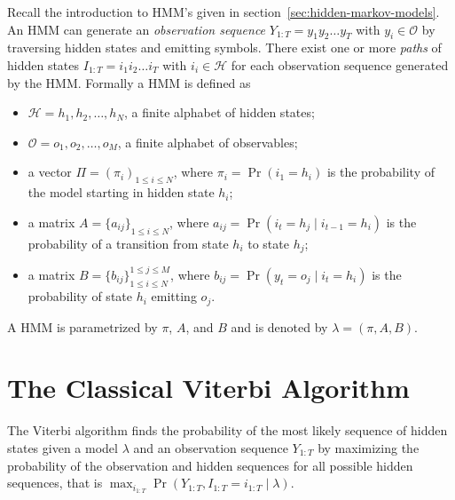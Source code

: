 Recall the introduction to HMM's given in
section~\ref{sec:hidden-markov-models}. An HMM can generate an \emph{observation
  sequence} $Y_{1:T} = y_1y_2\dots{}y_T$ with $y_i \in \mathcal{O}$ by
traversing hidden states and emitting symbols. There exist one or more
\emph{paths} of hidden states $I_{1:T} = i_1i_2\dots{}i_T$ with
$i_i \in \mathcal{H}$ for each observation sequence generated by the HMM. Formally
a HMM is defined as
\begin{itemize}
\item $\mathcal{H} = {h_1, h_2, \dots, h_N}$, a finite alphabet of hidden
  states;
\item $\mathcal{O} = {o_1, o_2, \dots, o_M}$, a finite alphabet of observables;
\item a vector $\Pi = {(\pi_i)}_{1 \le i \le N}$, where $\pi_i = \Pr(i_1 =
  h_i)$ is the probability of the model starting in hidden state $h_i$;
\item a matrix $A = {\{a_{ij}\}}_{1 \le i \le N}$, where $a_{ij} = \Pr(i_t
  = h_j \mid i_{t - 1} = h_i)$ is the probability of a transition from state
  $h_i$ to state $h_j$;
\item a matrix $B = {\{b_{ij}\}}_{1 \le i \le N}^{1 \le j \le M}$, where
  $b_{ij} = \Pr(y_t = o_j \mid i_t = h_i)$ is the probability of state
  $h_i$ emitting $o_j$.
\end{itemize}
A HMM is parametrized by $\pi$, $A$, and $B$ and is denoted by $\lambda =
(\pi, A, B)$.

\section{The Classical Viterbi Algorithm}
\label{sec:class-viterbi-algor}

The Viterbi algorithm finds the probability of the most likely sequence of
hidden states given a model $\lambda$ and an observation sequence $Y_{1:T}$ by
maximizing the probability of the observation and hidden sequences for all
possible hidden sequences, that is
$\max_{i_{1:T}} \Pr(Y_{1:T}, I_{1:T} = i_{1:T} \mid \lambda)$.

